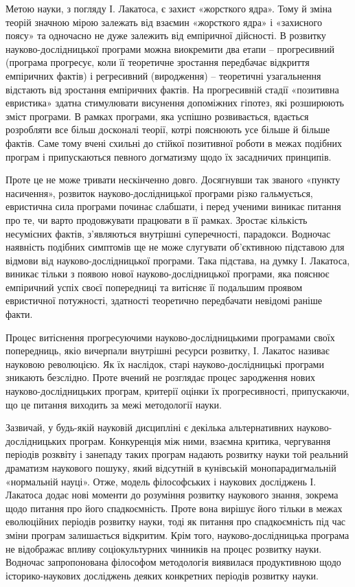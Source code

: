 Метою науки, з погляду І. Лакатоса, є захист «жорсткого ядра». Тому й
зміна теорій значною мірою залежать від взаємин «жорсткого ядра» і
«захисного поясу» та одночасно не дуже залежить від емпіричної дійсності. В
розвитку науково-дослідницької програми можна виокремити два етапи –
прогресивний (програма прогресує, коли її теоретичне зростання передбачає
відкриття емпіричних фактів) і регресивний (виродження) – теоретичні
узагальнення відстають від зростання емпіричних фактів. На прогресивній
стадії «позитивна евристика» здатна стимулювати висунення допоміжних
гіпотез, які розширюють зміст програми. В рамках програми, яка успішно
розвивається, вдається розробляти все більш досконалі теорії, котрі пояснюють
усе більше й більше фактів. Саме тому вчені схильні до стійкої позитивної
роботи в межах подібних програм і припускаються певного догматизму щодо їх
засадничих принципів.

Проте це не може тривати нескінченно довго. Досягнувши так званого
«пункту насичення», розвиток науково-дослідницької програми різко
гальмується, евристична сила програми починає слабшати, і перед ученими
виникає питання про те, чи варто продовжувати працювати в її рамках. Зростає
кількість несумісних фактів, з’являються внутрішні суперечності, парадокси.
Водночас наявність подібних симптомів ще не може слугувати об’єктивною
підставою для відмови від науково-дослідницької програми. Така підстава, на
думку І. Лакатоса, виникає тільки з появою нової науково-дослідницької
програми, яка пояснює емпіричний успіх своєї попередниці та витісняє її
подальшим проявом евристичної потужності, здатності теоретично передбачати
невідомі раніше факти.

Процес витіснення прогресуючими науково-дослідницькими програмами
своїх по\-пе\-ред\-ниць, якіо вичерпали внутрішні ресурси розвитку, І. Лакатос
називає науковою революцією. Як їх наслідок, старі науково-дослідницькі
програми зникають безслідно. Проте вчений не розглядає процес зародження
нових науково-дослідницьких програм, критерії оцінки їх прогресивності,
припускаючи, що це питання виходить за межі методології науки.

Зазвичай, у будь-якій науковій дисципліні є декілька альтернативних
науково-дос\-лідницьких програм. Конкуренція між ними, взаємна критика,
чергування періодів розквіту і занепаду таких програм надають розвитку науки
той реальний драматизм наукового пошуку, який відсутній в кунівській
монопарадигмальній «нормальній науці». Отже, модель філософських і 
наукових досліджень І. Лакатоса додає нові моменти до розуміння розвитку
наукового знання, зокрема щодо питання про його спадкоємність. Проте вона
вирішує його тільки в межах еволюційних періодів розвитку науки, тоді як
питання про спадкоємність під час зміни програм залишається відкритим. Крім
того, науково-дослідницька програма не відображає впливу соціокультурних
чинників на процес розвитку науки. Водночас запропонована філософом
методологія виявилася продуктивною щодо історико-наукових досліджень
деяких конкретних періодів розвитку науки.

